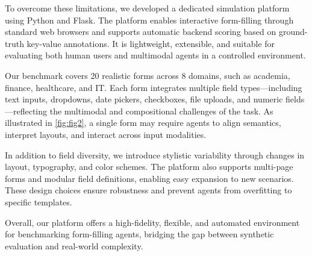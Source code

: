 \documentclass[sigconf, screen, review]{acmart}
\begin{document}
To overcome these limitations, we developed a dedicated simulation platform using Python and Flask.
The platform enables interactive form-filling through standard web browsers and supports automatic backend scoring based on ground-truth key-value annotations.
It is lightweight, extensible, and suitable for evaluating both human users and multimodal agents in a controlled environment.

Our benchmark covers 20 realistic forms across 8 domains, such as academia, finance, healthcare, and IT.
Each form integrates multiple field types—including text inputs, dropdowns, date pickers, checkboxes, file uploads, and numeric fields—reflecting the multimodal and compositional challenges of the task.
As illustrated in \cref{fig:fig2}, a single form may require agents to align semantics, interpret layouts, and interact across input modalities.

In addition to field diversity, we introduce stylistic variability through changes in layout, typography, and color schemes.
The platform also supports multi-page forms and modular field definitions, enabling easy expansion to new scenarios.
These design choices ensure robustness and prevent agents from overfitting to specific templates.

Overall, our platform offers a high-fidelity, flexible, and automated environment for benchmarking form-filling agents, bridging the gap between synthetic evaluation and real-world complexity.
\end{document}
